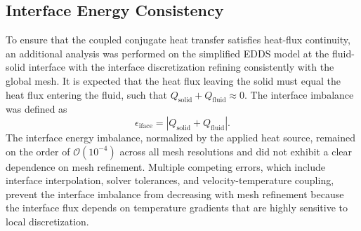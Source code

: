\subsection{Interface Energy Consistency}
To ensure that the coupled conjugate heat transfer satisfies heat-flux continuity, an additional analysis was performed on the simplified EDDS model at the fluid-solid interface with the interface discretization refining consistently with the global mesh. It is expected that the heat flux leaving the solid must equal the heat flux entering the fluid, such that $Q_{\text{solid}} + Q_{\text{fluid}} \approx 0$. The interface imbalance was defined as
\begin{equation}
\epsilon_{\text{iface}} = |Q_{\text{solid}} + Q_{\text{fluid}}|.
\label{eq:interface_imbalance}
\end{equation}
The interface energy imbalance, normalized by the applied heat source, remained on the order of $\mathcal{O}(10^{-4})$ across all mesh resolutions and did not exhibit a clear dependence on mesh refinement. Multiple competing errors, which include interface interpolation, solver tolerances, and velocity-temperature coupling, prevent the interface imbalance from decreasing with mesh refinement because the interface flux depends on temperature gradients that are highly sensitive to local discretization.




